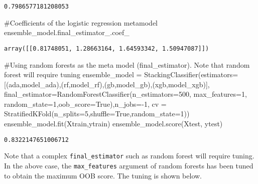 \documentclass[
  letterpaper,
  DIV=11,
  numbers=noendperiod]{scrreprt}
\newenvironment{Shaded}{\begin{snugshade}}{\end{snugshade}}
\newcommand{\CommentTok}[1]{\textcolor[rgb]{0.37,0.37,0.37}{#1}}
\newcommand{\DecValTok}[1]{\textcolor[rgb]{0.68,0.00,0.00}{#1}}
\newcommand{\NormalTok}[1]{\textcolor[rgb]{0.00,0.23,0.31}{#1}}
\newcommand{\OperatorTok}[1]{\textcolor[rgb]{0.37,0.37,0.37}{#1}}
\newcommand{\StringTok}[1]{\textcolor[rgb]{0.13,0.47,0.30}{#1}}
\newcommand{\VariableTok}[1]{\textcolor[rgb]{0.07,0.07,0.07}{#1}}
\begin{document}
\begin{verbatim}
0.7986577181208053
\end{verbatim}

\begin{Shaded}
\begin{Highlighting}[]
\CommentTok{\#Coefficients of the logistic regression metamodel}
\NormalTok{ensemble\_model.final\_estimator\_.coef\_}
\end{Highlighting}
\end{Shaded}

\begin{verbatim}
array([[0.81748051, 1.28663164, 1.64593342, 1.50947087]])
\end{verbatim}

\begin{Shaded}
\begin{Highlighting}[]
\CommentTok{\#Using random forests as the meta model (final\_estimator). Note that random forest will require tuning}
\NormalTok{ensemble\_model }\OperatorTok{=}\NormalTok{ StackingClassifier(estimators}\OperatorTok{=}\NormalTok{[(}\StringTok{\textquotesingle{}ada\textquotesingle{}}\NormalTok{,model\_ada),(}\StringTok{\textquotesingle{}rf\textquotesingle{}}\NormalTok{,model\_rf),(}\StringTok{\textquotesingle{}gb\textquotesingle{}}\NormalTok{,model\_gb),(}\StringTok{\textquotesingle{}xgb\textquotesingle{}}\NormalTok{,model\_xgb)],}
\NormalTok{                                   final\_estimator}\OperatorTok{=}\NormalTok{RandomForestClassifier(n\_estimators}\OperatorTok{=}\DecValTok{500}\NormalTok{, max\_features}\OperatorTok{=}\DecValTok{1}\NormalTok{,}
\NormalTok{                                                                          random\_state}\OperatorTok{=}\DecValTok{1}\NormalTok{,oob\_score}\OperatorTok{=}\VariableTok{True}\NormalTok{),n\_jobs}\OperatorTok{={-}}\DecValTok{1}\NormalTok{,}
\NormalTok{                                   cv }\OperatorTok{=}\NormalTok{ StratifiedKFold(n\_splits}\OperatorTok{=}\DecValTok{5}\NormalTok{,shuffle}\OperatorTok{=}\VariableTok{True}\NormalTok{,random\_state}\OperatorTok{=}\DecValTok{1}\NormalTok{))}
\NormalTok{ensemble\_model.fit(Xtrain,ytrain)}
\NormalTok{ensemble\_model.score(Xtest, ytest)}
\end{Highlighting}
\end{Shaded}

\begin{verbatim}
0.8322147651006712
\end{verbatim}

Note that a complex \texttt{final\_estimator} such as random forest will
require tuning. In the above case, the \texttt{max\_features} argument
of random forests has been tuned to obtain the maximum OOB score. The
tuning is shown below.
\end{document}
